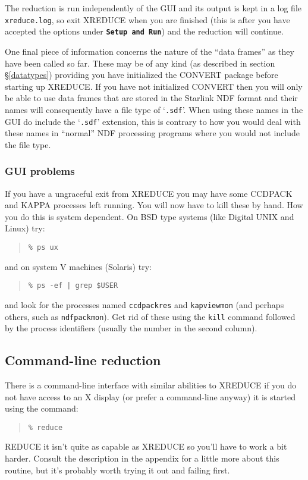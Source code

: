 \documentclass[twoside,11pt]{article}
\newcommand{\hyperref}[4]{#2\ref{#4}#3}
\newcommand{\htmlref}[2]{#1}
\newcommand{\latexhtml}[2]{#1}
\newcommand{\xref}[3]{#1}
\renewcommand{\_}{\texttt{\symbol{95}}}
\newcommand{\ttsize}{\latexhtml{\small}{}}
\newenvironment{myquote}{\begin{quote}\ttsize}{\end{quote}}
\newcommand{\butt}[1]{{\ttsize \bf \tt #1}}
\newcommand{\text}[1]{{\ttsize \tt #1}}
\newcommand{\routine}[1]{{\sc #1}}
\newcommand{\xroutine}[1]{\htmlref{{\sc #1}}{#1}}
\begin{document}
The reduction is run independently of the GUI and its output is kept
in a log file \text{xreduce.log}, so exit \routine{XREDUCE} when you
are finished (this is after you have accepted the options under
\butt{Setup and Run}) and the reduction will continue.

One final piece of information concerns the nature of the ``data
frames'' as they have been called so far. These may be of any kind (as
described \hyperref{later}{in section \S}{}{datatypes}) providing you
have initialized the \xref{CONVERT}{sun55}{} package before starting
up \routine{XREDUCE}.  If you have not initialized CONVERT then you
will only be able to use data frames that are stored in the Starlink
\xref{NDF}{sun33}{} format and their names will consequently have a
file type of `\text{.sdf}'. When using these names in the GUI do
include the `\text{.sdf}' extension, this is contrary to how you would
deal with these names in ``normal'' NDF processing programs where you
would not include the file type.

\subsubsection{GUI problems}
If you have a ungraceful exit from \xroutine{XREDUCE} you may have
some CCDPACK and \xref{KAPPA}{sun95}{} processes left running.  You
will now have to kill these by hand.  How you do this is system
dependent.  On BSD type systems (like Digital UNIX and Linux) try:
\begin{myquote}
\begin{verbatim}
% ps ux
\end{verbatim}
\end{myquote}
and on system V machines (Solaris) try:
\begin{myquote}
\begin{verbatim}
% ps -ef | grep $USER
\end{verbatim}
\end{myquote}
and look for the processes named \text{ccdpack\_res} and
\text{kapview\_mon} (and perhaps others, such as
\text{ndfpack\_mon}).
Get rid of these using the \text{kill} command followed by the
process identifiers (usually the number in the second column).

\subsection{Command-line reduction}
There is a command-line interface with similar abilities to
\xroutine{XREDUCE} if you do not have access to an X display (or prefer
a command-line anyway) it is started using the command:
\begin{myquote}
\begin{verbatim}
% reduce
\end{verbatim}
\end{myquote}
\xroutine{REDUCE} it isn't quite as capable as \routine{XREDUCE} so
you'll have to work a bit harder.  Consult the description in the
appendix for a little more about this routine, but it's probably
worth trying it out and failing first.
\end{document}
